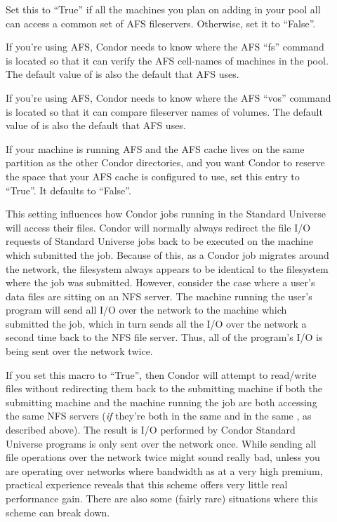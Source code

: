 \begin{description}
\item[] \label{param:HasAfs} Set this to ``True'' if
  all the machines you plan on adding in your pool all can access a
  common set of AFS fileservers.  Otherwise, set it to ``False''.
      
\item[] \label{param:FsPathname} If you're using
  AFS, Condor needs to know where the AFS ``fs'' command is located so
  that it can verify the AFS cell-names of machines in the pool.  The
  default value of  is also the default that
  AFS uses.
  
\item[] \label{param:VosPathname} If you're using
  AFS, Condor needs to know where the AFS ``vos'' command is located
  so that it can compare fileserver names of volumes.  The default
  value of  is also the default that AFS
  uses. 

\item[] \label{param:ReserveAfsCache} If
  your machine is running AFS and the AFS cache lives on the same
  partition as the other Condor directories, and you want Condor to
  reserve the space that your AFS cache is configured to use, set this
  entry to ``True''.  It defaults to ``False''.
  
\item[] \label{param:UseNfs} This setting influences
  how Condor jobs running in the Standard Universe will access their
  files.  Condor will normally always redirect the file I/O requests
  of Standard Universe jobs back to be executed on the machine which
  submitted the job.  Because of this, as a Condor job migrates around
  the network, the filesystem always appears to be identical to the
  filesystem where the job was submitted.  However, consider the case
  where a user's data files are sitting on an NFS server. The machine
  running the user's program will send all I/O over the network to the
  machine which submitted the job, which in turn sends all the I/O
  over the network a second time back to the NFS file server. Thus,
  all of the program's I/O is being sent over the network twice.
          
  If you set this macro to ``True'', then Condor will attempt to
  read/write files without redirecting them back to the submitting
  machine if both the submitting machine and the machine running the job
  are both accessing the same NFS servers (\emph{if} they're both in the
  same  and in the same ,
  as described above).  The result is I/O performed by Condor Standard
  Universe programs is only sent over the network once.  
  While sending all file operations over the network twice might sound
  really bad, unless you are operating over networks where bandwidth
  as at a very high premium, practical experience reveals that this
  scheme offers very little real performance gain.  There are also
  some (fairly rare) situations where this scheme can break down.
  

\end{description}
